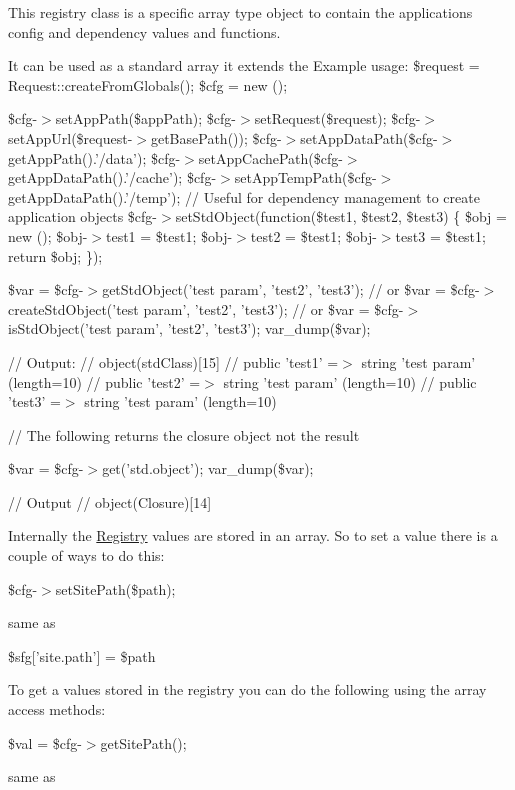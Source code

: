This registry class is a specific array type object to contain the applications config and dependency values and functions.

It can be used as a standard array it extends the  Example usage\+: {\ttfamily  \$request = Request\+::create\+From\+Globals(); \$cfg = new ();}

{\ttfamily \$cfg-\/$>$set\+App\+Path(\$app\+Path); \$cfg-\/$>$set\+Request(\$request); \$cfg-\/$>$set\+App\+Url(\$request-\/$>$get\+Base\+Path()); \$cfg-\/$>$set\+App\+Data\+Path(\$cfg-\/$>$get\+App\+Path().'/data'); \$cfg-\/$>$set\+App\+Cache\+Path(\$cfg-\/$>$get\+App\+Data\+Path().'/cache'); \$cfg-\/$>$set\+App\+Temp\+Path(\$cfg-\/$>$get\+App\+Data\+Path().'/temp'); // Useful for dependency management to create application objects \$cfg-\/$>$set\+Std\+Object(function(\$test1, \$test2, \$test3) \{ \$obj = new (); \$obj-\/$>$test1 = \$test1; \$obj-\/$>$test2 = \$test1; \$obj-\/$>$test3 = \$test1; return \$obj; \});}

{\ttfamily \$var = \$cfg-\/$>$get\+Std\+Object('test param', 'test2', 'test3'); // or \$var = \$cfg-\/$>$create\+Std\+Object('test param', 'test2', 'test3'); // or \$var = \$cfg-\/$>$is\+Std\+Object('test param', 'test2', 'test3'); var\+\_\+dump(\$var);}

{\ttfamily  // Output\+: // object(std\+Class)\mbox{[}15\mbox{]} // public 'test1' =$>$ string 'test param' (length=10) // public 'test2' =$>$ string 'test param' (length=10) // public 'test3' =$>$ string 'test param' (length=10)}

{\ttfamily  // The following returns the closure object not the result}

{\ttfamily \$var = \$cfg-\/$>$get('std.\+object'); var\+\_\+dump(\$var);}

{\ttfamily // Output // object(\+Closure)\mbox{[}14\mbox{]}}

{\ttfamily }

Internally the \hyperlink{classTk_1_1Util_1_1Registry}{Registry} values are stored in an array. So to set a value there is a couple of ways to do this\+:

\$cfg-\/$>$set\+Site\+Path(\$path);

same as

\$sfg\mbox{[}'site.\+path'\mbox{]} = \$path

To get a values stored in the registry you can do the following using the array access methods\+:

\$val = \$cfg-\/$>$get\+Site\+Path();

same as

